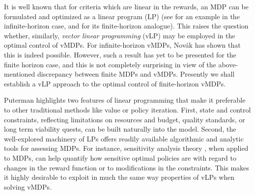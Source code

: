 \documentclass{article}
\theoremstyle{definition}
\numberwithin{equation}{section}
\begin{document}
{%
%
%

It is well known that for criteria which are linear in the rewards, an MDP can be formulated and optimized as a linear program (LP) (see \cite{16} for an example in the infinite-horizon case, and \cite{4} for its finite-horizon analogue). This raises the question whether, similarly, \textit{vector linear programming} (vLP) may be employed in the optimal control of vMDPs. For infinite-horizon vMDPs, Novák \cite{15} has shown that this is indeed possible. However, such a result has yet to be presented for the finite horizon case, and this is not completely surprising in view of the above-mentioned discrepancy between finite MDPs and vMDPs. Presently we shall establish a vLP approach to the optimal control of finite-horizon vMDPs. 

Puterman \cite{16} highlights two features of linear programming that make it preferable to other traditional methods like value or policy iteration. First,
state and control constraints, reflecting limitations on resources and budget, quality standards, or long term viability quests, can be built naturally into the model.  Second, 
the well-explored machinery of LPs offers readily available algorithmic and analytic tools for assessing MDPs. For instance, sensitivity analysis theory \cite{5}, when applied to MDPs, can help quantify how sensitive optimal policies are with regard to changes in the reward function or to modifications in the constraints.
This makes it highly desirable to exploit in much the same way properties of vLPs when solving vMDPs.

}
\end{document}

